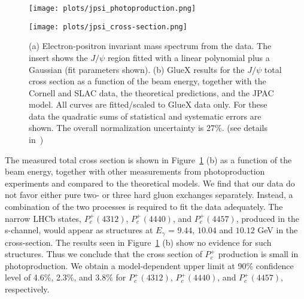 \documentclass[a4paper]{jpconf}
\begin{document}
\begin{figure}[h]
    \centering
    \begin{minipage}{16pc}
        \texttt{[image: plots/jpsi\_photoproduction.png]}
    \end{minipage}\hspace{3pc}%
    \begin{minipage}{16pc}
        \texttt{[image: plots/jpsi\_cross-section.png]}
    \end{minipage}
    \caption{\label{fig.4} (a) Electron-positron invariant mass spectrum from the data. The insert shows the $J/\psi$ region fitted with a linear polynomial plus a Gaussian (fit parameters shown). (b) GlueX results for the $J/\psi$ total cross section as a function of the beam energy, together with the Cornell and SLAC data, the theoretical predictions, and the JPAC model. All curves are fitted/scaled to GlueX data only. For these data the quadratic sums of statistical and systematic errors are shown. The overall normalization uncertainty is 27$\%$. (see details in~\cite{ref.5})}
\end{figure}

The measured total cross section is shown in Figure~\ref{fig.4} (b) as a function of the beam energy, together with other measurements from photoproduction experiments and compared to the theoretical models. We find that our data do not favor either pure two- or three hard gluon exchanges separately. Instead, a combination of the two processes is required to fit the data adequately. The narrow LHCb states, $P^{+}_{c}(4312)$, $P^{+}_{c}(4440)$, and $P^{+}_{c}(4457)$, produced in the s-channel, would appear as structures at $E_{\gamma}$ = $9.44$, $10.04$ and $10.12$ GeV in the cross-section. The results seen in Figure~\ref{fig.4} (b) show no evidence for such structures. Thus we conclude that the cross section of $P^{+}_{c}$ production is small in photoproduction. We obtain a model-dependent upper limit at 90$\%$ confidence level of 4.6$\%$, 2.3$\%$, and 3.8$\%$ for $P^{+}_{c}(4312)$, $P^{+}_{c}(4440)$, and $P^{+}_{c}(4457)$, respectively.
\end{document}
